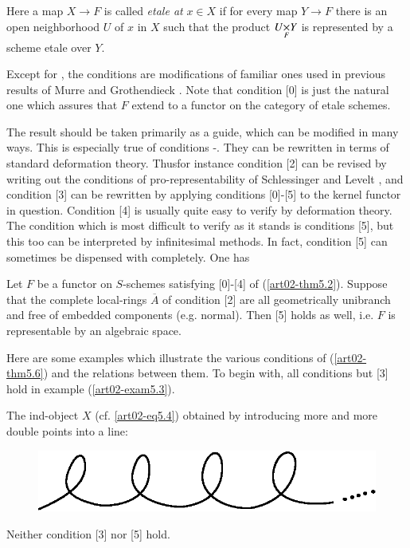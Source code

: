 \noindent
Here a map $X\to F$ is called {\em etale at} $x\in X$ if for every map $Y\to F$ there is an open neighborhood $U$ of $x$ in $X$ such that the product $\fprod{U}{Y}{F}$ is represented by a scheme etale over $Y$.

Except for \cite{art02-key4}, the conditions are modifications of familiar ones used in previous results of Murre \cite{art02-key27} and Grothendieck \cite{art02-key28}. Note that condition [0] is just the natural one which assures that $F$ extend to a functor on the category of etale schemes.

The result should be taken primarily as a guide, which can be modified in many ways. This is especially true of conditions \cite{art02-key2}-\cite{art02-key5}. They can be rewritten in terms of standard deformation theory. Thus\pageoriginale for instance condition [2] can be revised by writing out the conditions of pro-representability of Schlessinger \cite{art02-key32} and Levelt \cite{art02-key21}, and condition [3] can be rewritten by applying conditions [0]-[5] to the kernel functor in question. Condition [4] is usually quite easy to verify by deformation theory. The condition which is most difficult to verify as it stands is conditions [5], but this too can be interpreted by infinitesimal methods. In fact, condition [5] can sometimes be dispensed with completely. One has

\begin{theorem}\label{art02-thm5.7}
Let $F$ be a functor on $S$-schemes satisfying [0]-[4] of (\ref{art02-thm5.2}). Suppose that the complete local-rings $\overline{A}$ of condition [2] are all geometrically unibranch and free of embedded components (e.g. normal). Then [5] holds as well, i.e. $F$ is representable by an algebraic space.
\end{theorem}

Here are some examples which illustrate the various conditions of (\ref{art02-thm5.6}) and the relations between them. To begin with, all conditions but [3] hold in example (\ref{art02-exam5.3}).

\begin{example}\label{art02-exam5.8}
The ind-object $X$ (cf. \eqref{art02-eq5.4}) obtained by introducing more and more double points into a line:
\begin{figure}[H]
\centering
\includegraphics{figure/fig2.eps}
\end{figure}
Neither condition [3] nor [5] hold.
\end{example}

